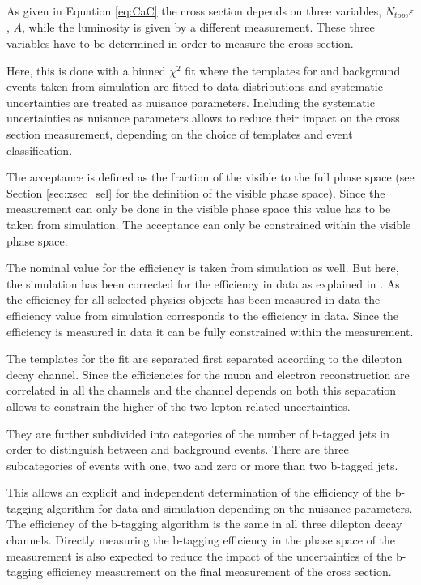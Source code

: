 As given in Equation \ref{eq:CaC} the cross section depends on three variables, $N_{top}$,$\varepsilon$, $A$, while the luminosity is given by a different measurement.
These three variables have to be determined in order to measure the cross section. 

Here, this is done with a binned $\chi^2$ fit where the templates for \ttbar and background events taken from simulation are fitted to data distributions and systematic uncertainties are treated as nuisance parameters.
Including the systematic uncertainties as nuisance parameters allows to reduce their impact on the cross section measurement, depending on the choice of templates and event classification.


The acceptance is defined as the fraction of the visible to the full phase space (see Section \ref{sec:xsec_sel} for the definition of the visible phase space).
Since the measurement can only be done in the visible phase space this value has to be taken from simulation. The acceptance can only be constrained within the visible phase space.

The nominal value for the efficiency is taken from simulation as well.  But here, the simulation has been corrected for the efficiency in data as explained in . 
As the efficiency for all selected physics objects has been measured in data the efficiency value from simulation corresponds to the efficiency in data.
Since the efficiency is measured in data it can be fully constrained within the measurement.

The templates for the fit are separated first separated according to the dilepton decay channel. Since the efficiencies for the muon and electron reconstruction are correlated in all the channels and the \emu channel depends on both this separation allows to constrain the higher of the two lepton related uncertainties.

They are further subdivided into categories of the number of b-tagged jets in order to distinguish between \ttbar and background events. There are three subcategories of events with one, two and zero or more than two b-tagged jets.

This allows an explicit and independent determination of the efficiency of the b-tagging algorithm for data and simulation depending on the nuisance parameters. The efficiency of the b-tagging algorithm is the same in all three dilepton decay channels.
Directly measuring the b-tagging efficiency in the phase space of the measurement is also expected to reduce the impact of the uncertainties of the b-tagging efficiency measurement on the final measurement of the \ttbar cross section.


